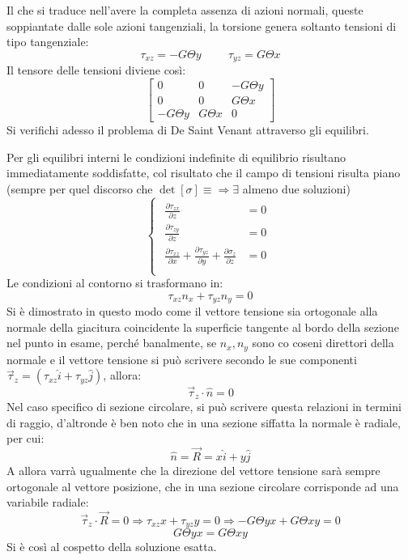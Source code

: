 		Il che si traduce nell'avere la completa assenza di azioni normali, queste soppiantate dalle sole azioni tangenziali, la torsione genera soltanto tensioni di tipo tangenziale: 
		\[ \tau_{xz} = -G\Theta y \hspace{1cm} \tau_{yz} = G\Theta x\]
		Il tensore delle tensioni diviene così: 
	 	\[ \left[ \begin{array}{ccc}
		0 & 0 & -G\Theta y \\
		0 & 0 & G\Theta x \\
		-G\Theta y & G\Theta x & 0
		\end{array}\right] \]
		Si verifichi adesso il problema di De Saint Venant attraverso gli equilibri. 
		
		Per gli equilibri interni le condizioni indefinite di equilibrio risultano immediatamente soddisfatte, col risultato che il campo di tensioni risulta piano (sempre per quel discorso che $\det[\sigma]\equiv\Rightarrow\exists$ almeno due soluzioni) 
		\[
		\begin{cases}
			\begin{aligned}
				\frac{\partial \tau_{zx}}{\partial z} & =0 \\
				
				\frac{\partial \tau_{zy}}{\partial z} & =0 \\
				
				\frac{\partial \tau_{xz}}{\partial x} + \frac{\partial \tau_{yz}}{\partial y} + \frac{\partial\sigma_z}{\partial z} & =0 \\
			\end{aligned}
		\end{cases}
		\]
		Le condizioni al contorno si trasformano in:
		\[ \tau_{xz}n_x + \tau_{yz}n_y = 0\]
		Si è dimostrato in questo modo come il vettore tensione sia ortogonale alla normale
		della giacitura coincidente la superficie tangente al
		bordo della sezione nel punto in esame, perché banalmente, se $n_x, n_y$ sono co coseni direttori della normale e il vettore tensione si può scrivere secondo le sue componenti $\vec{\tau}_z = (\tau_{xz}\hat{i} +  \tau_{yz}\hat{j})$, allora:
		\[\vec{\tau}_z \cdot \hat{n} = 0\]
		Nel caso specifico di sezione circolare, si può scrivere questa relazioni in termini di raggio, d'altronde è ben noto che in una sezione siffatta la normale è radiale, per cui: 
		\[\hat{n} = \vec{R} = x\hat{i} + y\hat{j}\]
		A allora varrà ugualmente che la direzione del vettore tensione sarà sempre ortogonale al vettore posizione, che in una sezione circolare corrisponde ad una variabile radiale:
		\[\vec{\tau}_z \cdot \vec{R} = 0 \Rightarrow \tau_{xz}x +  \tau_{yz}y = 0 \Rightarrow -G\Theta yx + G\Theta xy =0 \]
		\[ G\Theta yx = G\Theta xy \]
		Si è così al cospetto della soluzione esatta. 
		
